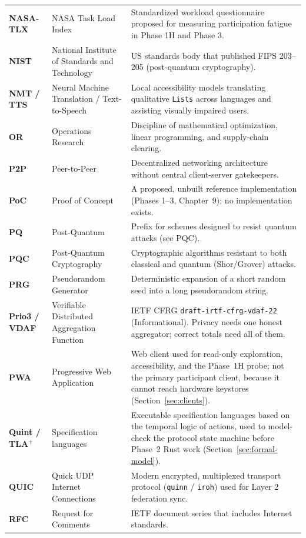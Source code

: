 \documentclass[10pt,twoside,openany]{book}
\theoremstyle{dpepstyle}
\begin{document}
{\begin{longtable}{L{0.92in} L{1.75in} L{1.95in}}
\textbf{NASA-TLX} & NASA Task Load Index & Standardized workload questionnaire proposed for measuring participation fatigue in Phase 1H and Phase 3. \\
\textbf{NIST} & National Institute of Standards and Technology & US standards body that published FIPS 203--205 (post-quantum cryptography). \\
\textbf{NMT / TTS} & Neural Machine Translation / Text-to-Speech & Local accessibility models translating qualitative \texttt{Lists} across languages and assisting visually impaired users. \\
\textbf{OR} & Operations Research & Discipline of mathematical optimization, linear programming, and supply-chain clearing. \\
\textbf{P2P} & Peer-to-Peer & Decentralized networking architecture without central client-server gatekeepers. \\
\textbf{PoC} & Proof of Concept & A proposed, unbuilt reference implementation (Phases 1--3, Chapter~9); no implementation exists. \\
\textbf{PQ} & Post-Quantum & Prefix for schemes designed to resist quantum attacks (see PQC). \\
\textbf{PQC} & Post-Quantum Cryptography & Cryptographic algorithms resistant to both classical and quantum (Shor/Grover) attacks. \\
\textbf{PRG} & Pseudorandom Generator & Deterministic expansion of a short random seed into a long pseudorandom string. \\
\textbf{Prio3 / VDAF} & Verifiable Distributed Aggregation Function & IETF CFRG \texttt{draft-irtf-cfrg-vdaf-22} (Informational). Privacy needs one honest aggregator; correct totals need all of them. \\
\textbf{PWA} & Progressive Web Application & Web client used for read-only exploration, accessibility, and the Phase~1H probe; not the primary participant client, because it cannot reach hardware keystores (Section~\ref{sec:clients}). \\
\textbf{Quint / TLA$^+$} & Specification languages & Executable specification languages based on the temporal logic of actions, used to model-check the protocol state machine before Phase~2 Rust work (Section~\ref{sec:formal-model}). \\
\textbf{QUIC} & Quick UDP Internet Connections & Modern encrypted, multiplexed transport protocol (\texttt{quinn} / \texttt{iroh}) used for Layer 2 federation sync. \\
\textbf{RFC} & Request for Comments & IETF document series that includes Internet standards. \\

\end{longtable}}
\end{document}

